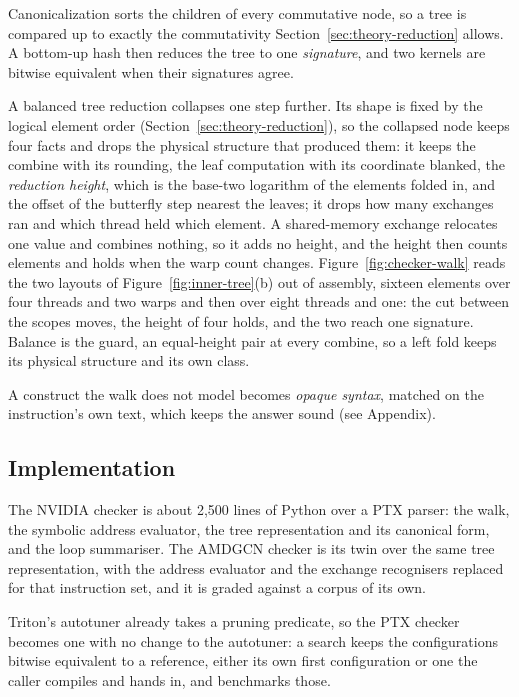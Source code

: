 \documentclass[sigplan,nonacm]{acmart}
\begin{document}
Canonicalization sorts the children of every commutative node, so a tree is
compared up to exactly the commutativity Section~\ref{sec:theory-reduction}
allows. A bottom-up hash then reduces the tree to one \emph{signature}, and two
kernels are bitwise equivalent when their signatures agree.

A balanced tree reduction collapses one step further. Its shape is fixed by the
logical element order (Section~\ref{sec:theory-reduction}), so the collapsed node
keeps four facts and drops the physical structure that produced them: it keeps
the combine with its rounding, the leaf computation with its coordinate blanked,
the \emph{reduction height}, which is the base-two logarithm of the elements
folded in, and the offset of the butterfly step nearest the leaves; it drops how
many exchanges ran and which thread held which element. A shared-memory exchange
relocates one value and combines nothing, so it adds no height, and the height
then counts elements and holds when the warp count changes.
Figure~\ref{fig:checker-walk} reads the two layouts of
Figure~\ref{fig:inner-tree}(b) out of assembly, sixteen elements over four threads
and two warps and then over eight threads and one: the cut between the scopes
moves, the height of four holds, and the two reach one signature. Balance is the guard, an equal-height pair at
every combine, so a left fold keeps its physical structure and its own class.

A construct the walk does not model becomes \emph{opaque syntax}, matched on
the instruction's own text, which keeps the answer sound (see Appendix).

\subsection{Implementation}
\label{sec:checking-impl}

The NVIDIA checker is about 2,500 lines of Python over a PTX parser: the walk,
the symbolic address evaluator, the tree representation and its canonical form,
and the loop summariser. The AMDGCN checker is its twin over the same tree
representation, with the address evaluator and the exchange recognisers replaced
for that instruction set, and it is graded against a corpus of its own.

Triton's autotuner already takes a pruning predicate, so the PTX checker becomes
one with no change to the autotuner: a search keeps the configurations bitwise
equivalent to a reference, either its own first configuration or one the caller
compiles and hands in, and benchmarks those.
\end{document}
